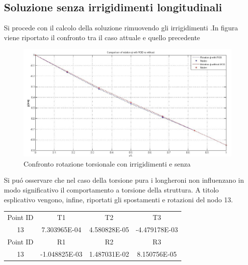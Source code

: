 \documentclass[12pt,a4paper]{article}
\begin{document}
\subsection{Soluzione senza irrigidimenti longitudinali}
 Si procede con il calcolo della soluzione rimuovendo gli irrigidimenti .In figura viene riportato il confronto tra il caso attuale e
quello precedente
\begin{figure}[htbp]
	\centering
	\includegraphics[width=150mm]{Immagini/confrontorodtors}
	\caption{Confronto rotazione torsionale con irrigidimenti e senza}
\end{figure}
\newpage
Si pu\'o osservare che nel caso della torsione pura i longheroni non influenzano in modo
significativo il comportamento a torsione della struttura.
A titolo esplicativo vengono, infine, riportati gli spostamenti e rotazioni del nodo 13.\\
 \begin{center}
 \begin{tabular}{c c c c}
 \hline
 Point ID& T1 & T2 & T3\\
 13 & 7.303965E-04 & 4.580828E-05 & -4.479178E-03\\
 \hline
 Point ID & R1 & R2 & R3\\
 13 & -1.048825E-03 & 1.487031E-02 & 8.150756E-05\\
 \hline
 \end{tabular}\\ 
 \end{center}
\end{document}
